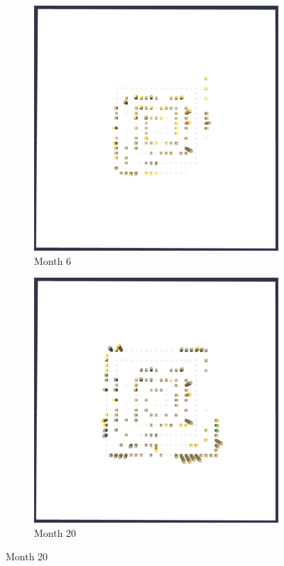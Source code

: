 \begin{figure}[t!]
    \begin{subfigure}{0.48\textwidth}
    \includegraphics[width=\linewidth]{JetUML_V2S1.png}
    \caption{Month 6} \label{fig:JetUML_V2S1}
    \end{subfigure}\hspace*{\fill}
    \begin{subfigure}{0.48\textwidth}
        \includegraphics[width=\linewidth]{JetUML_V2S2.png}
        \caption{Month 20} \label{fig:JetUML_V2V2}
    \end{subfigure}
    

\end{figure}

